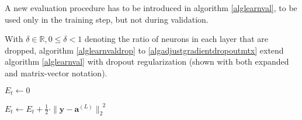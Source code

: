 \documentclass{article}
\begin{document}
          A new evaluation procedure has to be introduced in algorithm
          \ref{alglearnval}, to be used only in the training step, but not during
          validation.

          With $\delta \in \mathbb{R}, 0 \leq \delta < 1$ denoting the ratio of
          neurons in each layer that are dropped, algorithm
          \ref{alglearnvaldrop} to \ref{algadjustgradientdropoutmtx} extend
          algorithm \ref{alglearnval} with dropout regularization (shown with
          both expanded and matrix-vector notation).

          \begin{algorithm}
            \caption{%
              Modified version of algorithm \ref{alglearnval} with droput
              regularization.
            } \label{alglearnvaldrop}
            \begin{algorithmic}
                \State $E_t \gets 0$

                  \State {}
                  \State {}
                  \State $
                    E_t \gets
                      E_t
                      +
                      \frac{1}{2}
                      \cdot
                      \| \mathbf{y} - \mathbf{a}^{(L)} \|_2^{\enspace 2}
                  $
                \EndFor
              \EndProcedure
            \end{algorithmic}
          \end{algorithm}
\end{document}
